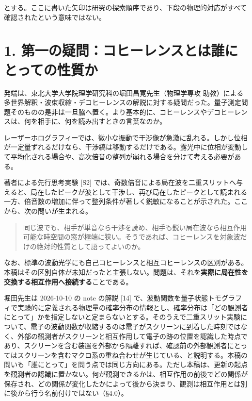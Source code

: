 \documentclass[
  a4paper,
]{ltjsarticle}
\begin{document}
とする。ここに書いた矢印は研究の探索順序であり、下段の物理的対応がすべて確認されたという意味ではない。

\section{1.
第一の疑問：コヒーレンスとは誰にとっての性質か}\label{ux7b2cux4e00ux306eux7591ux554fux30b3ux30d2ux30fcux30ecux30f3ux30b9ux3068ux306fux8ab0ux306bux3068ux3063ux3066ux306eux6027ux8ceaux304b}

発端は、東北大学大学院理学研究科の堀田昌寛先生（物理学専攻
助教）による多世界解釈・波束収縮・デコヒーレンスの解説に対する疑問だった。量子測定問題そのものの是非は一旦脇へ置く。より基本的に、コヒーレンスやデコヒーレンスは、何を相手に、何を読み出すときの言葉なのか。

レーザーホログラフィーでは、微小な振動で干渉像が急激に乱れる。しかし位相が一定量ずれるだけなら、干渉縞は移動するだけである。露光中に位相が変動して平均化される場合や、高次倍音の整列が崩れる場合を分けて考える必要がある。

著者による先行思考実験 {[}S2{]}
では、奇数倍音による局在波を二重スリットへ与えると、局在したピークが波として干渉し、再び局在したピークとして読まれる一方、倍音数の増加に伴って整列条件が著しく鋭敏になることが示された。ここから、次の問いが生まれる。

\begin{quote}
同じ波でも、相手が単音なら干渉を読め、相手も鋭い局在波なら相互作用可能な時空間の窓が極端に狭い。そうであれば、コヒーレンスを対象波だけの絶対的性質として語ってよいのか。
\end{quote}

なお、標準の波動光学にも自己コヒーレンスと相互コヒーレンスの区別がある。本稿はその区別自体が未知だったと主張しない。問題は、それを\textbf{実際に局在性を交換する相互作用へ接続する}ことである。

堀田先生は 2026-10-10 の note の解説 {[}14{]}
で、波動関数を量子状態トモグラフィで実験的に定義される物理量の確率分布の情報とし、確率分布は「どの観測者にとって」かを指定しないと定まらないとする。そのうえで二重スリット実験について、電子の波動関数が収縮するのは電子がスクリーンに到着した時刻ではなく、外部の観測者がスクリーンと相互作用して電子の跡の位置を認識した時点であり、スクリーンを含む装置を外部から隔離すれば、確認前の外部観測者にとってはスクリーンを含むマクロ系の重ね合わせが生じている、と説明する。本稿の問いも「誰にとって」を問う点では同じ方向にある。ただし本稿は、更新の起点を観測者の認識に置かない。何が観測できるかは、相互作用の前後でどの関係が保存され、どの関係が変化したかによって後から決まり、観測は相互作用とは別に後から行う名前付けではない（§4.0）。
\end{document}

